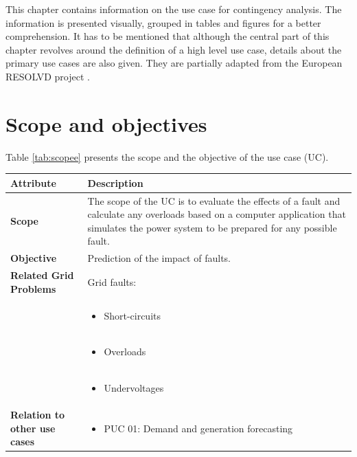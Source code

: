 This chapter contains information on the use case for contingency analysis. The information is presented visually, grouped in tables and figures for a better comprehension. It has to be mentioned that although the central part of this chapter revolves around the definition of a high level use case, details about the primary use cases are also given. They are partially adapted from the European RESOLVD project \cite{melendez2019resolvd}.

\section{Scope and objectives}
Table \ref{tab:scopee} presents the scope and the objective of the use case (UC).

\begin{table}[!htb]\centering
  \renewcommand{\arraystretch}{1.6}
    \centering
\begin{tabularx}{\linewidth}{|l|L|} 
    \hline
\textbf{Attribute} & \textbf{Description}\\ 
    \hline
\textbf{Scope} & The scope of the UC is to evaluate the effects of a fault and calculate any overloads based on a computer application that simulates the power system to be prepared for any possible fault. \\
\hline
\textbf{Objective} & Prediction of the impact of faults. \\
\hline
\textbf{Related Grid Problems} & Grid faults: \\
                               & \vspace{-0.25cm} \begin{itemize} \item Short-circuits \end{itemize} \\
                               & \vspace{-0.75cm} \begin{itemize} \item Overloads \end{itemize} \\
                               & \vspace{-0.75cm} \begin{itemize} \item Undervoltages \end{itemize} \\
    \hline
\textbf{Relation to other use cases} & \begin{itemize} \item PUC 01: Demand and generation forecasting \end{itemize} \\

\end{tabularx}
\end{table}
